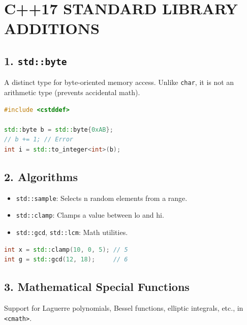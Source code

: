 \hypertarget{c17-standard-library-additions}{%
\chapter{C++17 STANDARD LIBRARY
ADDITIONS}\label{c17-standard-library-additions}}

\hypertarget{stdbyte}{%
\section{\texorpdfstring{1.
\texttt{std::byte}}{1. std::byte}}\label{stdbyte}}

A distinct type for byte-oriented memory access. Unlike
\passthrough{\lstinline!char!}, it is not an arithmetic type (prevents
accidental math).

\begin{lstlisting}[language={C++}]
#include <cstddef>

std::byte b = std::byte{0xAB};
// b += 1; // Error
int i = std::to_integer<int>(b);
\end{lstlisting}

\hypertarget{algorithms}{%
\section{2. Algorithms}\label{algorithms}}

\begin{itemize}
\tightlist
\item
  \passthrough{\lstinline!std::sample!}: Selects n random elements from
  a range.
\item
  \passthrough{\lstinline!std::clamp!}: Clamps a value between lo and
  hi.
\item
  \passthrough{\lstinline!std::gcd!},
  \passthrough{\lstinline!std::lcm!}: Math utilities.
\end{itemize}

\begin{lstlisting}[language={C++}]
int x = std::clamp(10, 0, 5); // 5
int g = std::gcd(12, 18);     // 6
\end{lstlisting}

\hypertarget{mathematical-special-functions}{%
\section{3. Mathematical Special
Functions}\label{mathematical-special-functions}}

Support for Laguerre polynomials, Bessel functions, elliptic integrals,
etc., in \passthrough{\lstinline!<cmath>!}.

